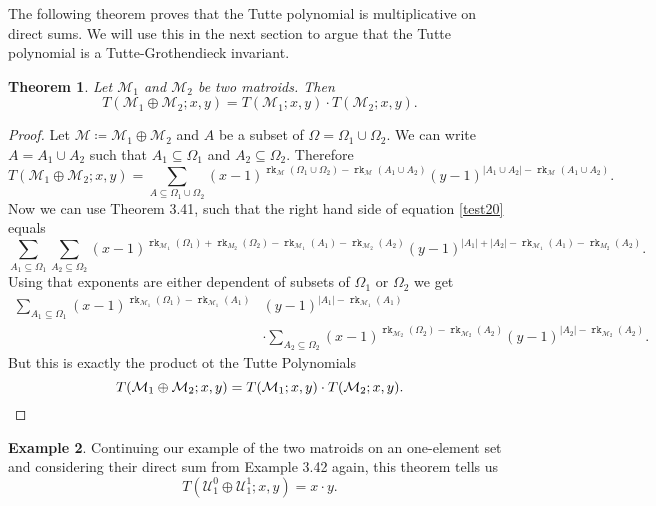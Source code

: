 \documentclass[12pt,a4paper, twoside, autooneside=false]{scrartcl}
\newtheorem{theorem}{Theorem}[section]
\theoremstyle{definition}
\newtheorem{beispiel}[theorem]{Example}
\theoremstyle{remark}
\numberwithin{equation}{section}
\DeclareMathOperator{\rk}{\mathtt{rk}}
\newcommand{\M}{\mathcal{M}} %
\begin{document}
The following theorem proves that the Tutte polynomial is multiplicative on direct sums. We will use this in the next section to argue that the Tutte polynomial is a Tutte-Grothendieck invariant. 
\begin{theorem}
Let $\M_1$ and $\M_2$ be two matroids. Then 
\[
T(\M_1 \oplus \M_2; x,y) = T(\M_1; x,y) \cdot T(\M_2; x,y).
\]
\end{theorem}
\begin{proof}
Let $\M \coloneqq \M_1 \oplus \M_2$ and $A$ be a subset of $\Omega = \Omega_1 \cup \Omega_2$. We can write $A = A_1 \cup A_2$ such that $A_1 \subseteq \Omega_1$ and $A_2 \subseteq \Omega_2$. Therefore
\begin{equation}\label{test20}
T(\M_1 \oplus \M_2; x,y) = \sum_{A \subseteq \Omega_1 \cup \Omega_2} (x - 1)^{\rk_{\M}(\Omega_1 \cup \Omega_2)- \rk_{\M}(A_1 \cup A_2)} (y - 1)^{|A_1 \cup A_2| - \rk_{\M}(A_1 \cup A_2)}.
\end{equation}
Now we can use Theorem 3.41, such that the right hand side of equation \eqref{test20} equals 
\[
\sum_{A_1 \subseteq \Omega_1}\sum_{A_2 \subseteq \Omega_2} (x - 1)^{\rk_{\M_1}(\Omega_1) + \rk_{M_2}(\Omega_2) - \rk_{\M_1}(A_1) - \rk_{\M_2}(A_2)} (y - 1)^{|A_1| + |A_2| - \rk_{\M_1}(A_1) - \rk_{M_2}(A_2)}. 
\]
Using that exponents are either dependent of subsets of $\Omega_1$ or $\Omega_2$ we get 
\begin{align*}
\sum_{A_1 \subseteq \Omega_1} (x - 1)^{\rk_{\M_1}(\Omega_1) - \rk_{\M_1}(A_1)} & (y - 1)^{|A_1| - \rk_{\M_1}(A_1)}  \\ & \cdot \sum_{A_2 \subseteq \Omega_2}(x - 1)^{\rk_{\M_2}(\Omega_2) - \rk_{\M_2}(A_2)} (y - 1)^{|A_2| - \rk_{\M_2}(A_2)}.
\end{align*}
But this is exactly the product ot the Tutte Polynomials 
\[
T(\M_1 \oplus \M_2;x,y) = T(\M_1; x,y) \cdot T(\M_2;x,y). \qedhere
\]
\end{proof}
\begin{beispiel}
Continuing our example of the two matroids on an one-element set and considering their direct sum from Example 3.42 again, this theorem tells us 
\[
T(\mathcal{U}_1^0 \oplus \mathcal{U}_1^1;x,y) = x \cdot y.
\]
\end{beispiel}
\end{document}
